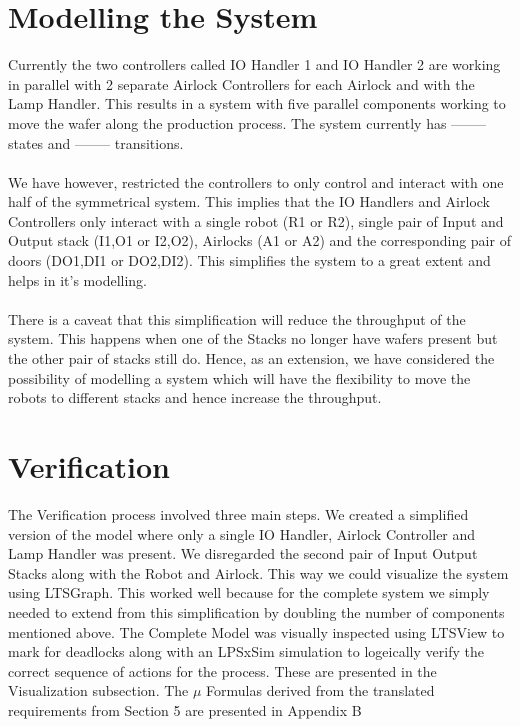 \documentclass[a4paper,12pt]{article}
\begin{document}
\section{Modelling the System}
Currently the two controllers called IO Handler 1 and IO Handler 2 are working in parallel with 2 separate Airlock Controllers for each Airlock and with the Lamp Handler. This results in a system with five parallel components working to move the wafer along the production process. The system currently has -------- states and -------- transitions.
\\
\\We have however, restricted the controllers to only control and interact with one half of the symmetrical system. This implies that the IO Handlers and Airlock Controllers only interact with a single robot (R1 or R2), single pair of Input and Output stack (I1,O1 or I2,O2), Airlocks (A1 or A2) and the corresponding pair of doors (DO1,DI1 or DO2,DI2). This simplifies the system to a great extent and helps in it's modelling.
\\
\\There is a caveat that this simplification will reduce the throughput of the system. This happens when one of the Stacks no longer have wafers present but the other pair of stacks still do. Hence, as an extension, we have considered the possibility of modelling a system which will have the flexibility to move the robots to different stacks and hence increase the throughput. 
\newpage
\section{Verification}
The Verification process involved three main steps. We created a simplified version of the model where only a single IO Handler, Airlock Controller and Lamp Handler was present. We disregarded the second pair of Input Output Stacks along with the Robot and Airlock. This way we could visualize the system using LTSGraph. This worked well because for the complete system we simply needed to extend from this simplification by doubling the number of components mentioned above. The Complete Model was visually inspected using LTSView to mark for deadlocks along with an LPSxSim simulation to logeically verify the correct sequence of actions for the process. These are presented in the Visualization subsection. The $\mu$ Formulas derived from the translated requirements from Section 5 are presented in Appendix B 
\end{document}
